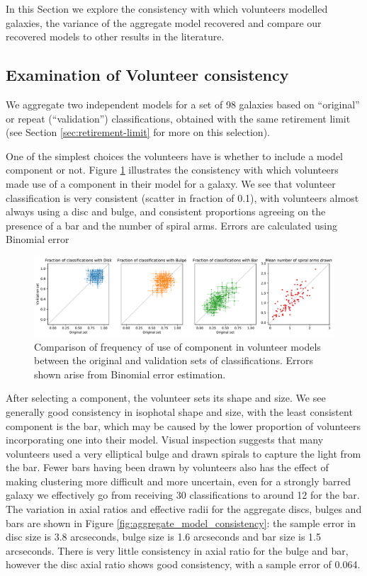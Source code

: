 \documentclass[../main.tex]{subfiles}
\begin{document}
\label{sec:results}

In this Section we explore the consistency with which volunteers modelled galaxies, the variance of the aggregate model recovered and compare our recovered models to other results in the literature.

\subsection{Examination of Volunteer consistency}
We aggregate two independent models for a set of 98 galaxies based on ``original'' or repeat (``validation'') classifications, obtained with the same retirement limit (see Section \ref{sec:retirement-limit} for more on this selection).

One of the simplest choices the volunteers have is whether to include a model component or not. Figure \ref{fig:volunteer_component_consistency} illustrates the consistency with which volunteers made use of a component in their model for a galaxy. We see that volunteer classification is very consistent (scatter in fraction of 0.1), with volunteers almost always using a disc and bulge, and consistent proportions agreeing on the presence of a bar and the number of spiral arms. Errors are calculated using Binomial error

\begin{figure}
  \includegraphics[width=17.3cm]{images__results/component_frequency.pdf}
  \caption{Comparison of frequency of use of component in volunteer models between the original and validation sets of classifications. Errors shown arise from Binomial error estimation.}
  \label{fig:volunteer_component_consistency}
\end{figure}

After selecting a component, the volunteer sets its shape and size. We see generally good consistency in isophotal shape and size, with the least consistent component is the bar, which may be caused by the lower proportion of volunteers incorporating one into their model. Visual inspection suggests that many volunteers used a very elliptical bulge and drawn spirals to capture the light from the bar. Fewer bars having been drawn by volunteers also has the effect of making clustering more difficult and more uncertain, even for a strongly barred galaxy we effectively go from receiving 30 classifications to around 12 for the bar. The variation in axial ratios and effective radii for the aggregate discs, bulges and bars are shown in Figure \ref{fig:aggregate_model_consistency}: the sample error in disc size is 3.8 arcseconds, bulge size is 1.6 arcseconds and bar size is 1.5 arcseconds. There is very little consistency in axial ratio for the bulge and bar, however the disc axial ratio shows good consistency, with a sample error of 0.064.
\end{document}
